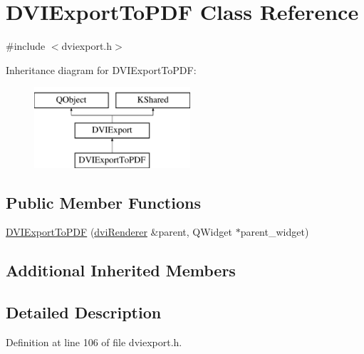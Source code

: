 \hypertarget{classDVIExportToPDF}{\section{D\+V\+I\+Export\+To\+P\+D\+F Class Reference}
\label{classDVIExportToPDF}
}


{\ttfamily \#include $<$dviexport.\+h$>$}

Inheritance diagram for D\+V\+I\+Export\+To\+P\+D\+F\+:\begin{figure}[H]
\begin{center}
\leavevmode
\includegraphics[height=3.000000cm]{classDVIExportToPDF}
\end{center}
\end{figure}
\subsection*{Public Member Functions}
\begin{DoxyCompactItemize}
\item 
\hyperlink{classDVIExportToPDF_a0cdc8ca30eb105257b68c9962e803c72}{D\+V\+I\+Export\+To\+P\+D\+F} (\hyperlink{classdviRenderer}{dvi\+Renderer} \&parent, Q\+Widget $\ast$parent\+\_\+widget)
\end{DoxyCompactItemize}
\subsection*{Additional Inherited Members}


\subsection{Detailed Description}


Definition at line 106 of file dviexport.\+h.



